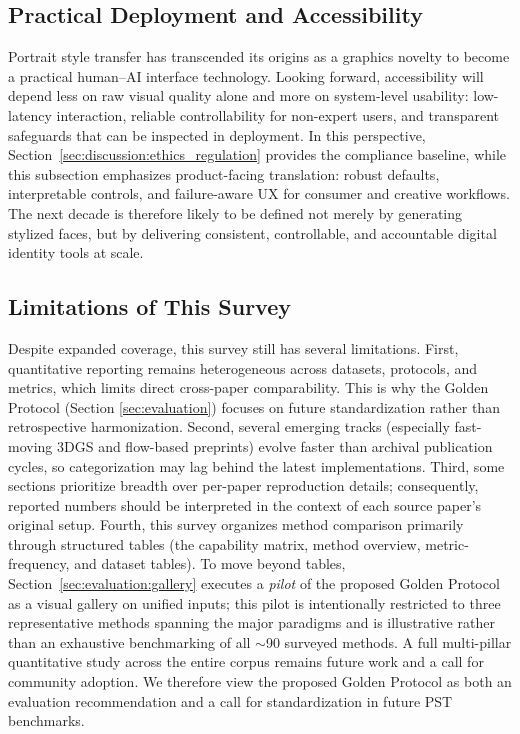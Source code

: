 \documentclass[journal]{IEEEtran}
\begin{document}
\subsection{Practical Deployment and Accessibility}
Portrait style transfer has transcended its origins as a graphics novelty to become a practical human--AI interface technology. Looking forward, accessibility will depend less on raw visual quality alone and more on system-level usability: low-latency interaction, reliable controllability for non-expert users, and transparent safeguards that can be inspected in deployment. In this perspective, Section~\ref{sec:discussion:ethics_regulation} provides the compliance baseline, while this subsection emphasizes product-facing translation: robust defaults, interpretable controls, and failure-aware UX for consumer and creative workflows. The next decade is therefore likely to be defined not merely by generating stylized faces, but by delivering consistent, controllable, and accountable digital identity tools at scale.

\subsection{Limitations of This Survey}
Despite expanded coverage, this survey still has several limitations. First, quantitative reporting remains heterogeneous across datasets, protocols, and metrics, which limits direct cross-paper comparability. This is why the Golden Protocol (Section \ref{sec:evaluation}) focuses on future standardization rather than retrospective harmonization. Second, several emerging tracks (especially fast-moving 3DGS and flow-based preprints) evolve faster than archival publication cycles, so categorization may lag behind the latest implementations. Third, some sections prioritize breadth over per-paper reproduction details; consequently, reported numbers should be interpreted in the context of each source paper's original setup. Fourth, this survey organizes method comparison primarily through structured tables (the capability matrix, method overview, metric-frequency, and dataset tables). To move beyond tables, Section~\ref{sec:evaluation:gallery} executes a \textit{pilot} of the proposed Golden Protocol as a visual gallery on unified inputs; this pilot is intentionally restricted to three representative methods spanning the major paradigms and is illustrative rather than an exhaustive benchmarking of all $\sim$90 surveyed methods. A full multi-pillar quantitative study across the entire corpus remains future work and a call for community adoption. We therefore view the proposed Golden Protocol as both an evaluation recommendation and a call for standardization in future PST benchmarks.
\end{document}
